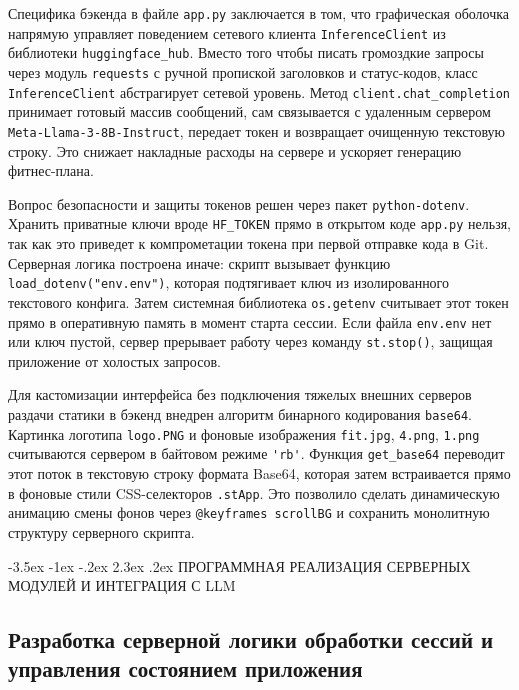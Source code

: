 \documentclass[14pt, a4paper]{extarticle}
\makeatletter
\renewcommand\section{\@startsection {section}{1}{\z@}%
                                   {-3.5ex \@plus -1ex \@minus -.2ex}%
                                   {2.3ex \@plus.2ex}%
                                   {\centering\normalfont\Large\bfseries}}
\makeatother
\begin{document}
Специфика бэкенда в файле \texttt{app.py} заключается в том, что графическая оболочка напрямую управляет поведением сетевого клиента \texttt{InferenceClient} из библиотеки \verb|huggingface_hub|. Вместо того чтобы писать громоздкие запросы через модуль \texttt{requests}\cite{http_spec} с ручной пропиской заголовков и статус-кодов, класс \texttt{InferenceClient} абстрагирует сетевой уровень. Метод \verb|client.chat_completion| принимает готовый массив сообщений, сам связывается с удаленным сервером \texttt{Meta-Llama-3-8B-Instruct}, передает токен и возвращает очищенную текстовую строку. Это снижает накладные расходы на сервере и ускоряет генерацию фитнес-плана.

Вопрос безопасности и защиты токенов решен через пакет \texttt{python-dotenv}\cite{dotenv,twelve_factor}. Хранить приватные ключи вроде \verb|HF_TOKEN| прямо в открытом коде \texttt{app.py} нельзя, так как это приведет к компрометации токена при первой отправке кода в Git. Серверная логика построена иначе: скрипт вызывает функцию \verb|load_dotenv("env.env")|, которая подтягивает ключ из изолированного текстового конфига. Затем системная библиотека \verb|os.getenv| считывает этот токен прямо в оперативную память в момент старта сессии. Если файла \texttt{env.env} нет или ключ пустой, сервер прерывает работу через команду \verb|st.stop()|, защищая приложение от холостых запросов.

Для кастомизации интерфейса без подключения тяжелых внешних серверов раздачи статики в бэкенд внедрен алгоритм бинарного кодирования \texttt{base64}\cite{base64_spec}. Картинка логотипа \texttt{logo.PNG} и фоновые изображения \texttt{fit.jpg}, \texttt{4.png}, \texttt{1.png} считываются сервером в байтовом режиме \verb|'rb'|. Функция \verb|get_base64| переводит этот поток в текстовую строку формата Base64, которая затем встраивается прямо в фоновые стили CSS-селекторов \verb|.stApp|. Это позволило сделать динамическую анимацию смены фонов через \verb|@keyframes scrollBG| и сохранить монолитную структуру серверного скрипта.




\newpage
\section{ПРОГРАММНАЯ РЕАЛИЗАЦИЯ СЕРВЕРНЫХ МОДУЛЕЙ И ИНТЕГРАЦИЯ С LLM}

\subsection{Разработка серверной логики обработки сессий и управления состоянием приложения}
\end{document}
